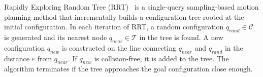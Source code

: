 \documentclass[usletter, 10pt, conference]{ieeeconf} %
\def\qrand{q_{rand}}
\def\qnear{q_{near}}
\def\qnew{q_{new}}
\def\T{\mathcal{T}}
\def\C{\mathcal{C}}
\begin{document}

Rapidly Exploring Random Tree (RRT)~\cite{lavalleRRT} is a single-query sampling-based motion planning method that 
incrementally builds a configuration tree rooted at the initial configuration.
In each iteration of RRT, a random configuration $\qrand \in \C$ is generated and its nearest node $\qnear \in \T$ in the tree is found.
A new configuration $\qnew$ is constructed on the line connecting $\qnear$ and $\qrand$ in the distance $\varepsilon$ from $\qnear$.
If $\qnew$ is collision-free, it is added to the tree.
The algorithm terminates if the tree approaches the goal configuration close enough.

\end{document}
